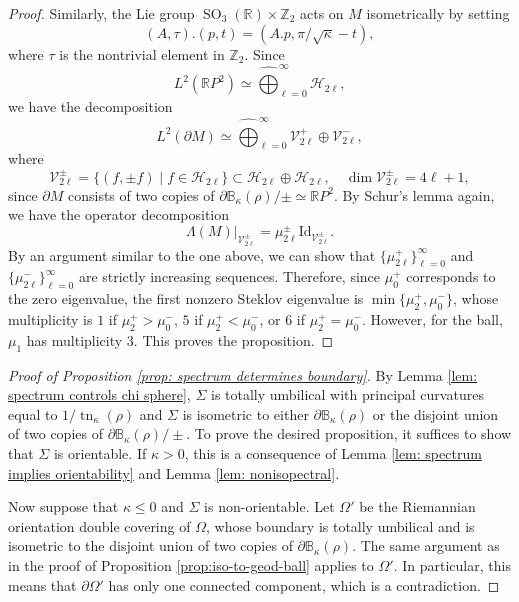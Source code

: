 \documentclass[11pt]{amsart}
\newcommand*{\Id}{\mathrm{Id}}
\newcommand{\tn}{\operatorname{tn}}
\theoremstyle{definition}
\numberwithin{equation}{section}
\begin{document}
\begin{proof}
 

    Similarly, the Lie group $\operatorname{SO}_3(\mathbb R)\times \mathbb Z_2$ acts on $M$ isometrically by setting
    \[(A,\tau).(p,t) = (A.p, \pi/\sqrt{\kappa}-t),\]
    where $\tau$ is the nontrivial element in $\mathbb Z_2$. 
    Since 
    \[L^2(\mathbb RP^2)\simeq\widehat\bigoplus_{\ell = 0}^\infty \mathcal H_{2\ell},\]
    we have the decomposition
    \[L^2(\partial M)\simeq\widehat\bigoplus_{\ell = 0}^\infty \mathcal V_{2\ell}^+\oplus\mathcal V_{2\ell}^-,\]
    where
    \[\mathcal V_{2\ell}^\pm = \{(f,\pm f)\mid f\in\mathcal H_{2\ell}\}\subset\mathcal H_{2\ell}\oplus \mathcal H_{2\ell},\quad\dim\mathcal V_{2\ell}^\pm = 4\ell + 1,\]
    since $\partial M$ consists of two copies of $\partial\mathbb B_\kappa(\rho)/\pm\simeq\mathbb RP^2$. By Schur's lemma again, we have the operator decomposition
    \[\Lambda(M)|_{\mathcal V_{2\ell}^\pm} = \mu_{2\ell}^\pm \Id_{\mathcal V_{2\ell}^\pm}.\]
    By an argument similar to the one above, we can show that $\{\mu_{2\ell}^+\}_{\ell = 0}^\infty$ and $\{\mu_{2\ell}^-\}_{\ell = 0}^\infty$ are strictly increasing sequences.
    Therefore, since $\mu_0^+$ corresponds to the zero eigenvalue, the first nonzero Steklov eigenvalue is $\min\{\mu_2^+,\mu_0^-\}$, whose multiplicity is $1$ if $\mu_2^+ > \mu_0^-$, $5$ if $\mu_2^+ < \mu_0^-$, or $6$ if $\mu_2^+ = \mu_0^-$. However, for the ball, $\mu_1$ has multiplicity $3$. This proves the proposition.
\end{proof}
 


\begin{proof}[Proof of Proposition \ref{prop: spectrum determines boundary}]

    By Lemma \ref{lem: spectrum controls chi sphere}, $\Sigma$ is totally umbilical with principal curvatures equal to $1/\tn_\kappa(\rho)$ and $\Sigma$ is isometric to either $\partial\mathbb B_\kappa(\rho)$ or the disjoint union of two copies of $\partial\mathbb B_\kappa(\rho)/\pm$. To prove the desired proposition, it suffices to show that $\Sigma$ is orientable. If $\kappa > 0$, this is a consequence of Lemma \ref{lem: spectrum implies orientability} and Lemma \ref{lem: nonisopectral}.

    Now suppose that $\kappa \le 0$ and $\Sigma$ is non-orientable. Let $\Omega'$ be the Riemannian orientation double covering of $\Omega$, whose boundary is totally umbilical and is isometric to the disjoint union of two copies of $\partial\mathbb B_\kappa(\rho)$. The same argument as in the proof of Proposition \ref{prop:iso-to-geod-ball} applies to $\Omega'$. In particular, this means that $\partial\Omega'$ has only one connected component, which is a contradiction. 
\end{proof}
\end{document}
